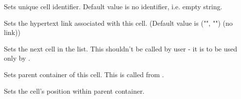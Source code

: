 Sets unique cell identifier. Default value is no identifier, i.e. empty string.

\label{wxhtmlcellsetlink}


Sets the hypertext link associated with this cell. (Default value
is ("", "") (no link))

\label{wxhtmlcellsetnext}


Sets the next cell in the list. This shouldn't be called by user - it is
to be used only by .

\label{wxhtmlcellsetparent}


Sets parent container of this cell. This is called from
.

\label{wxhtmlcellsetpos}


Sets the cell's position within parent container.

